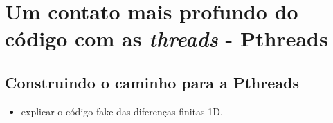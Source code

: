 \section{Um contato mais profundo do código com as \textit{threads} - Pthreads}
    
    \subsection{Construindo o caminho para a Pthreads}
    
	    \begin{itemize}
	    	\item explicar o código fake das diferenças finitas 1D.
	    \end{itemize}